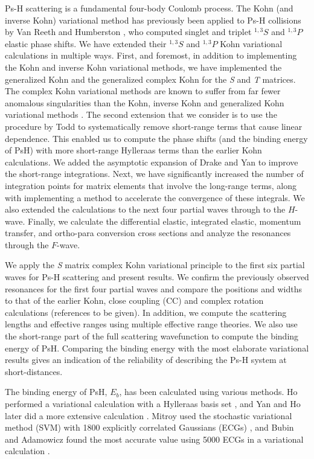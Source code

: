 \documentclass[preprint,showpacs,showkeys,preprintnumbers,amsmath,amssymb,longbibliography,pra,aps]{revtex4-1}
\begin{document}
Ps-H scattering is a fundamental four-body Coulomb process. The Kohn (and 
inverse Kohn) variational method has previously been applied to Ps-H 
collisions by Van Reeth and Humberston \cite{VanReeth2003,VanReeth2004}, who 
computed singlet and triplet $^{1,3}S$ and $^{1,3}P$ elastic phase shifts. We 
have extended their $^{1,3}S$ and $^{1,3}P$ Kohn variational calculations in 
multiple ways. First, and foremost, in addition to implementing
the Kohn and inverse Kohn variational methods, we have implemented the 
generalized Kohn and the generalized complex Kohn for the \emph{S} and \emph{T}
matrices. The complex Kohn variational methods are known to suffer
from far fewer anomalous singularities than the Kohn, inverse Kohn and 
generalized Kohn variational methods
\cite{Lucchese1989, Cooper2009, Cooper2010}. The second extension that we
consider is to use the procedure by Todd 
\cite{Todd2007} to systematically remove short-range terms that cause linear 
dependence. This enabled us to compute the phase shifts (and the binding 
energy of PsH) with more short-range Hylleraas terms than the earlier 
Kohn calculations. We added the asymptotic expansion of Drake and Yan
\cite{Drake1995, Yan1997} to improve the short-range integrations. Next, we
have significantly increased the number of integration points for matrix
elements that involve the long-range terms, along with implementing a method to
accelerate the convergence of these integrals. We also extended the 
calculations to the next four partial waves through to the $H$-wave. Finally, 
we calculate the differential elastic, integrated elastic, momentum transfer, 
and ortho-para conversion cross sections and analyze the resonances through 
the $F$-wave.

We apply the \emph{S} matrix complex Kohn variational principle to the first 
six partial waves for Ps-H scattering and present results. We confirm the 
previously observed resonances for the first four partial waves and compare 
the positions and widths to that of the earlier Kohn, close coupling (CC) and 
complex rotation calculations (references to be given). In addition, we 
compute the scattering lengths and effective ranges using multiple effective 
range theories. We also use the short-range part of the full scattering 
wavefunction to compute the binding energy of PsH. Comparing the binding 
energy with the most elaborate variational results gives an indication of the 
reliability of describing the Ps-H system at short-distances.

The binding energy of PsH, $E_b$, has been calculated using various methods. 
Ho performed a variational calculation with a Hylleraas basis set
\cite{Ho1986}, and Yan and Ho later did a more extensive calculation
\cite{Yan1999}. Mitroy used the stochastic variational method (SVM) with
1800 explicitly correlated Gaussians (ECGs) \cite{Mitroy2006}, and Bubin
and Adamowicz found the most accurate value using 5000 ECGs in a variational
calculation \cite{Bubin2006}.
 
\end{document}
